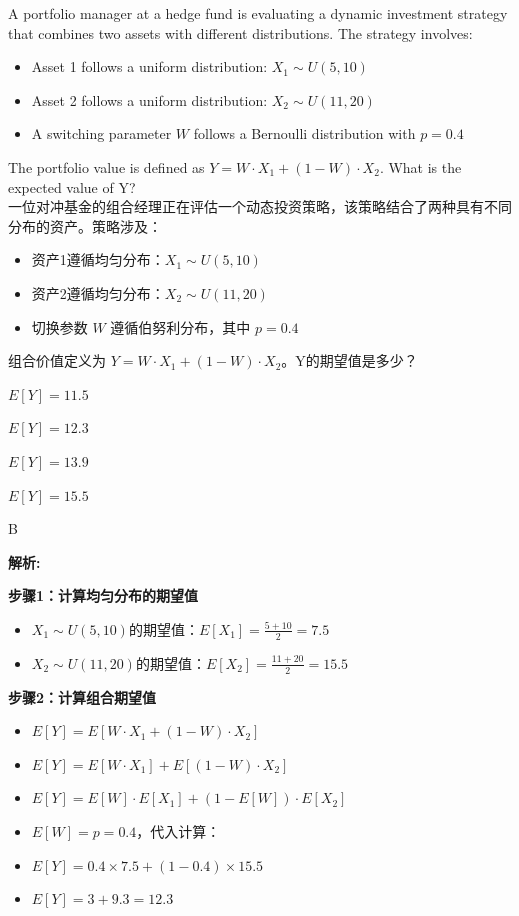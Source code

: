 \documentclass{article}
\newcounter{question} %
\newenvironment{explanation}
{\textbf{解析:}\par}
{\par}
\begin{document}
\begin{question}
A portfolio manager at a hedge fund is evaluating a dynamic investment strategy that combines two assets with different distributions. The strategy involves:
\begin{itemize}
    \item Asset 1 follows a uniform distribution: \(X_1 \sim U(5,10)\)
    \item Asset 2 follows a uniform distribution: \(X_2 \sim U(11,20)\)
    \item A switching parameter \(W\) follows a Bernoulli distribution with \(p = 0.4\)
\end{itemize}
The portfolio value is defined as \(Y = W \cdot X_1 + (1-W) \cdot X_2\). What is the expected value of Y?\\

    一位对冲基金的组合经理正在评估一个动态投资策略，该策略结合了两种具有不同分布的资产。策略涉及：
    \begin{itemize}
        \item 资产1遵循均匀分布：\(X_1 \sim U(5,10)\)
        \item 资产2遵循均匀分布：\(X_2 \sim U(11,20)\)
        \item 切换参数 \(W\) 遵循伯努利分布，其中 \(p = 0.4\)
    \end{itemize}
    组合价值定义为 \(Y = W \cdot X_1 + (1-W) \cdot X_2\)。Y的期望值是多少？
\end{question}

\begin{choices}
    \item \(E[Y] = 11.5\)
    \item \(E[Y] = 12.3\)
    \item \(E[Y] = 13.9\)
    \item \(E[Y] = 15.5\)
\end{choices}

\begin{correctanswer}
B
\end{correctanswer}

\begin{explanation}
\textbf{步骤1：计算均匀分布的期望值}
\begin{itemize}
    \item \(X_1 \sim U(5,10)\)的期望值：\(E[X_1] = \frac{5+10}{2} = 7.5\)
    \item \(X_2 \sim U(11,20)\)的期望值：\(E[X_2] = \frac{11+20}{2} = 15.5\)
\end{itemize}

\textbf{步骤2：计算组合期望值}
\begin{itemize}
    \item \(E[Y] = E[W \cdot X_1 + (1-W) \cdot X_2]\)
    \item \(E[Y] = E[W \cdot X_1] + E[(1-W) \cdot X_2]\)
    \item \(E[Y] = E[W] \cdot E[X_1] + (1-E[W]) \cdot E[X_2]\)
    \item \(E[W] = p = 0.4\)，代入计算：
    \item \(E[Y] = 0.4 \times 7.5 + (1-0.4) \times 15.5\)
    \item \(E[Y] = 3 + 9.3 = 12.3\)
\end{itemize}
\end{explanation}
\end{document}
